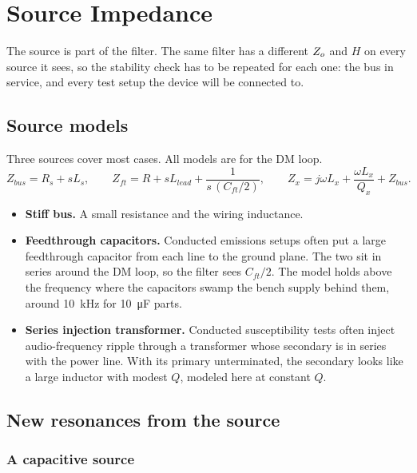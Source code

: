 \chapter{Source Impedance}
\label{ch:source}

\begin{idea}
	The source is part of the filter. The same filter has a different $Z_o$ and
	$H$ on every source it sees, so the stability check has to be repeated for
	each one: the bus in service, and every test setup the device will be
	connected to.
\end{idea}

\section{Source models}

Three sources cover most cases. All models are for the DM loop.
\begin{equation}\label{eq:source-models}
	Z_{bus} = R_s + sL_s, \qquad
	Z_{ft} = R + sL_{lead} + \frac{1}{s\,(C_{ft}/2)}, \qquad
	Z_{x} = j\omega L_x + \frac{\omega L_x}{Q_x} + Z_{bus}.
\end{equation}

\begin{itemize}
	\item \textbf{Stiff bus.} A small resistance and the wiring inductance.
	\item \textbf{Feedthrough capacitors.} Conducted emissions setups often put
	      a large feedthrough capacitor from each line to the ground plane. The two
	      sit in series around the DM loop, so the filter sees $C_{ft}/2$. The
	      model holds above the frequency where the capacitors swamp the bench
	      supply behind them, around \qty{10}{\kHz} for \qty{10}{\micro\farad} parts.
	\item \textbf{Series injection transformer.} Conducted susceptibility tests
	      often inject audio-frequency ripple through a transformer whose secondary
	      is in series with the power line. With its primary unterminated, the
	      secondary looks like a large inductor with modest $Q$, modeled here at
	      constant $Q$.
\end{itemize}

\section{New resonances from the source}

\subsection{A capacitive source}

